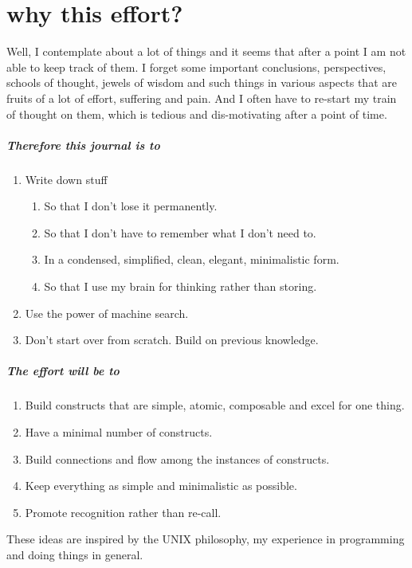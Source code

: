 \documentclass[./main.tex]{subfiles}
\begin{document}
\chapter*{why this effort?}

Well, I contemplate about a lot of things and it seems that after a point I am not able to keep track of them.
I forget some important conclusions, perspectives, schools of thought, jewels of wisdom and such things in various aspects that are fruits of a lot of effort, suffering and pain.
And I often have to re-start my train of thought on them, which is tedious and dis-motivating after a point of time.

\paragraph{Therefore this journal is to}

\begin{enumerate}
  \item Write down stuff
    \begin{enumerate}
      \item So that I don't lose it permanently.
      \item So that I don't have to remember what I don't need to.
      \item In a condensed, simplified, clean, elegant, minimalistic form.
      \item So that I use my brain for thinking rather than storing.
    \end{enumerate}
  \item Use the power of machine search.
  \item Don't start over from scratch. Build on previous knowledge.
\end{enumerate}

\begin{figure}[h]
  \centering
\end{figure}

\paragraph{The effort will be to}
\begin{enumerate}
  \item Build constructs that are simple, atomic, composable and excel for one thing.
  \item Have a minimal number of constructs.
  \item Build connections and flow among the instances of constructs.
  \item Keep everything as simple and minimalistic as possible.
  \item Promote recognition rather than re-call.
\end{enumerate}
These ideas are inspired by the UNIX philosophy, my experience in programming and doing things in general.
\end{document}
